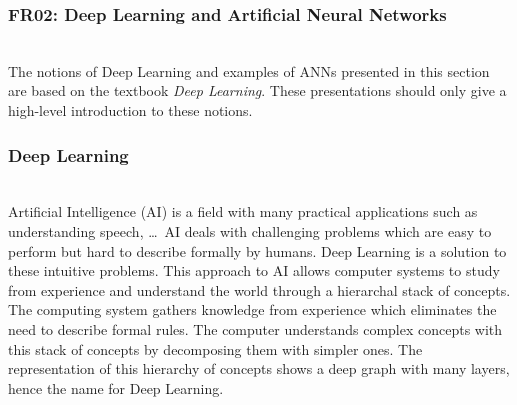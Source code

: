 
\subsubsection{FR02: Deep Learning and Artificial Neural Networks}~\\

The notions of Deep Learning and examples of ANNs presented in this section are
based on the textbook \textit{Deep Learning}\cite{Goodfellow-et-al-2016}. These
presentations should only give a high-level introduction to these notions.

\subsubsection{Deep Learning}~\\


Artificial Intelligence (AI) is a field with many practical applications such as
understanding speech, \dots \ AI deals with challenging problems which are easy to
perform but hard to describe formally by humans. Deep Learning is a solution to
these intuitive problems. This approach to AI allows computer systems to study
from experience and understand the world through a hierarchal stack of concepts.
The computing system gathers knowledge from experience which eliminates the need
to describe formal rules. The computer understands complex concepts with this
stack of concepts by decomposing them with simpler ones. The representation of
this hierarchy of concepts shows a deep graph with many layers, hence the name
for Deep Learning.~\cite{Goodfellow-et-al-2016}
